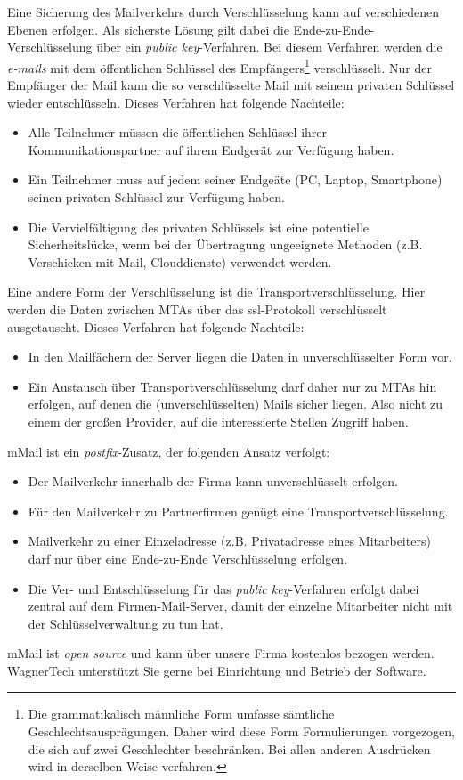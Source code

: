 \documentclass[a4paper]{scrartcl}
\begin{document}
\begin{multicols}{2}
Eine Sicherung des Mailverkehrs durch Verschlüsselung kann auf verschiedenen Ebenen erfolgen. Als sicherste Lösung gilt
dabei die Ende-zu-Ende-Verschlüsselung über ein \emph{public key}-Verfahren. Bei diesem Verfahren werden die \emph{e-mails}
mit dem öffentlichen Schlüssel des Empfängers\footnote{Die grammatikalisch männliche Form umfasse sämtliche 
Geschlechtsausprägungen. Daher wird diese Form Formulierungen vorgezogen, die sich auf zwei Geschlechter beschränken. 
Bei allen anderen Ausdrücken wird in derselben Weise verfahren.} 
verschlüsselt. Nur der Empfänger der Mail kann die 
so verschlüsselte Mail mit seinem privaten Schlüssel wieder entschlüsseln. Dieses Verfahren hat folgende Nachteile:
	\begin{itemize}
	\item Alle Teilnehmer müssen die öffentlichen Schlüssel ihrer Kommunikationspartner auf ihrem Endgerät zur Verfügung
		haben.
	\item Ein Teilnehmer muss auf jedem seiner Endgeäte (PC, Laptop, Smartphone) seinen privaten Schlüssel zur Verfügung
		haben.
	\item Die Vervielfältigung des privaten Schlüssels ist eine potentielle Sicherheitslücke, wenn bei der Übertragung
		ungeeignete Methoden (z.B. Verschicken mit Mail, Clouddienste) verwendet werden.
	\end{itemize}
Eine andere Form der Verschlüsselung ist die Transportverschlüsselung. Hier werden die Daten zwischen MTAs über das 
ssl-Protokoll verschlüsselt ausgetauscht. Dieses Verfahren hat folgende Nachteile:
	\begin{itemize}
	\item In den Mailfächern der Server liegen die Daten in unverschlüsselter Form vor.
	\item Ein Austausch über Transportverschlüsselung darf daher nur zu MTAs hin erfolgen, auf denen die (unverschlüsselten)
		Mails sicher liegen. Also nicht zu einem der großen Provider, auf die interessierte Stellen Zugriff haben.
	\end{itemize}
mMail ist ein \emph{postfix}-Zusatz, der folgenden Ansatz verfolgt:
	\begin{itemize}
	\item Der Mailverkehr innerhalb der Firma kann unverschlüsselt erfolgen.
	\item Für den Mailverkehr zu Partnerfirmen genügt eine Transportverschlüsselung.
	\item Mailverkehr zu einer Einzeladresse (z.B. Privatadresse eines Mitarbeiters) darf nur über eine Ende-zu-Ende
		Verschlüsselung erfolgen.
	\item Die Ver- und Entschlüsselung für das \emph{public key}-Verfahren erfolgt dabei zentral auf dem Firmen-Mail-Server,
		damit der einzelne Mitarbeiter nicht mit der Schlüsselverwaltung zu tun hat.
	\end{itemize}
mMail ist \emph{open source} und kann über unsere Firma kostenlos bezogen werden. WagnerTech unterstützt Sie gerne bei
Einrichtung und Betrieb der Software.

\end{multicols}
\end{document}
